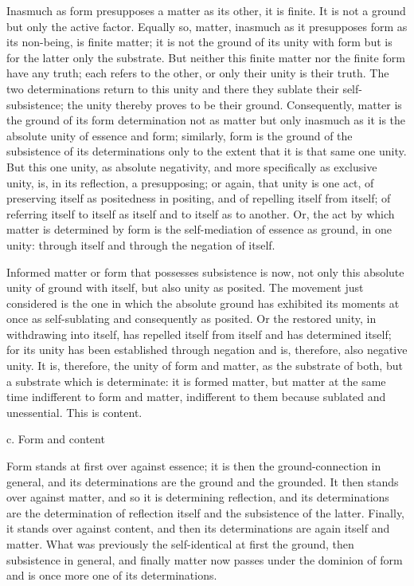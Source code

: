 Inasmuch as form presupposes a matter as its other, it is finite.
It is not a ground but only the active factor.
Equally so, matter, inasmuch as it presupposes
form as its non-being, is finite matter;
it is not the ground of its unity with form
but is for the latter only the substrate.
But neither this finite matter nor the finite form have any truth;
each refers to the other, or only their unity is their truth.
The two determinations return to
this unity and there they sublate their self-subsistence;
the unity thereby proves to be their ground.
Consequently, matter is the ground
of its form determination not as matter
but only inasmuch as it is the absolute unity of essence and form;
similarly, form is the ground of the subsistence of its determinations
only to the extent that it is that same one unity.
But this one unity, as absolute negativity,
and more specifically as exclusive unity,
is, in its reflection, a presupposing;
or again, that unity is one act,
of preserving itself as positedness in positing,
and of repelling itself from itself;
of referring itself to itself as itself
and to itself as to another.
Or, the act by which matter is determined by form
is the self-mediation of essence as ground, in one unity:
through itself and through the negation of itself.

Informed matter or form that possesses subsistence is now,
not only this absolute unity of ground with itself,
but also unity as posited.
The movement just considered is the one
in which the absolute ground has exhibited
its moments at once as self-sublating
and consequently as posited.
Or the restored unity, in withdrawing into itself,
has repelled itself from itself and
has determined itself;
for its unity has been established through negation
and is, therefore, also negative unity.
It is, therefore, the unity of form and matter,
as the substrate of both, but a substrate which is determinate:
it is formed matter, but matter at the same time
indifferent to form and matter,
indifferent to them because sublated and unessential.
This is content.

c. Form and content

Form stands at first over against essence;
it is then the ground-connection in general,
and its determinations are the ground and the grounded.
It then stands over against matter,
and so it is determining reflection,
and its determinations are the determination of reflection itself
and the subsistence of the latter.
Finally, it stands over against content,
and then its determinations are again itself and matter.
What was previously the self-identical
at first the ground,
then subsistence in general,
and finally matter
now passes under the dominion of form
and is once more one of its determinations.

